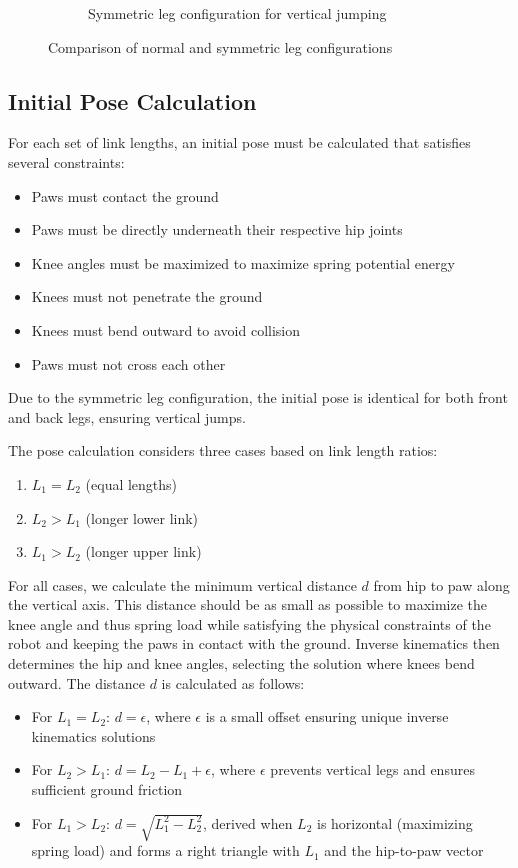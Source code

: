 \begin{figure}[h]
\begin{subfigure}[b]{0.48\textwidth}
        \caption{Symmetric leg configuration for vertical jumping}
    \end{subfigure}
    \caption{Comparison of normal and symmetric leg configurations}
    \label{fig:link_length_optimization:flipped_legs}
\end{figure}


\subsection{Initial Pose Calculation}
For each set of link lengths, an initial pose must be calculated that satisfies several constraints:

\begin{itemize}
    \item Paws must contact the ground
    \item Paws must be directly underneath their respective hip joints
    \item Knee angles must be maximized to maximize spring potential energy
    \item Knees must not penetrate the ground
    \item Knees must bend outward to avoid collision
    \item Paws must not cross each other
\end{itemize}

Due to the symmetric leg configuration, the initial pose is identical for both front and back legs, ensuring vertical jumps.

The pose calculation considers three cases based on link length ratios:

\begin{enumerate}
    \item \(L_1 = L_2\) (equal lengths)
    \item \(L_2 > L_1\) (longer lower link)
    \item \(L_1 > L_2\) (longer upper link)
\end{enumerate}

For all cases, we calculate the minimum vertical distance \(d\) from hip to paw along the vertical axis. This distance should be as small as possible to maximize the knee angle and thus spring load while satisfying the physical constraints of the robot and keeping the paws in contact with the ground. Inverse kinematics then determines the hip and knee angles, selecting the solution where knees bend outward. The distance \(d\) is calculated as follows:

\begin{itemize}
    \item For \(L_1 = L_2\): \(d = \epsilon\), where \(\epsilon\) is a small offset ensuring unique inverse kinematics solutions
    \item For \(L_2 > L_1\): \(d = L_2 - L_1 + \epsilon\), where \(\epsilon\) prevents vertical legs and ensures sufficient ground friction
    \item For \(L_1 > L_2\): \(d = \sqrt{L_1^2 - L_2^2}\), derived when \(L_2\) is horizontal (maximizing spring load) and forms a right triangle with \(L_1\) and the hip-to-paw vector
\end{itemize}

